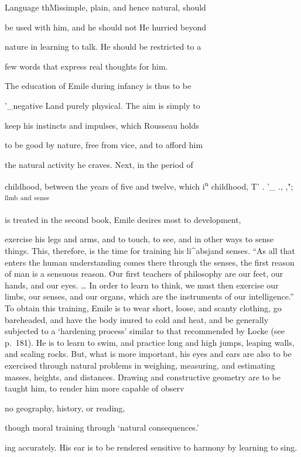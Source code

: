 \documentclass[
]{book}
\begin{document}
Language thMissimple, plain, and hence natural, should

be used with him, and he should not He hurried beyond

nature in learning to talk. He should be restricted to a

few words that express real thoughts for him.

The education of Emile during infancy is thus to be

'\_negative Land purely physical. The aim is simply to

keep his instincts and impulses, which Rousseau holds

to be good by nature, free from vice, and to afford him

the natural activity he craves. Next, in the period of

childhood, between the years of five and twelve, which i\textsuperscript{n} childhood, T' . '\_ ., ,"; \textsuperscript{llmb} \textsuperscript{and} \textsuperscript{sense}

is treated in the second book, Emile desires most to development,

exercise his legs and arms, and to touch, to see, and in other ways to sense things. This, therefore, is the time for training his li\^{}absjand senses. ``As all that enters the human understanding comes there through the senses, the first reason of man is a sensuous reason. Our first teachers of philosophy are our feet, our hands, and our eyes. \ldots{} In order to learn to think, we must then exercise our limbs, our senses, and our organs, which are the instruments of our intelligence.'' To obtain this training, Emile is to wear short, loose, and scanty clothing, go bareheaded, and have the body inured to cold and heat, and be generally subjected to a `hardening process' similar to that recommended by Locke (see p.~181). He is to learn to swim, and practice long and high jumps, leaping walls, and scaling rocks. But, what is more important, his eyes and ears are also to be exercised through natural problems in weighing, measuring, and estimating masses, heights, and distances. Drawing and constructive geometry are to be taught him, to render him more capable of observ

no geography, history, or reading,

though moral training through `natural consequences.'

ing accurately. His ear is to be rendered sensitive to harmony by learning to sing.
\end{document}
